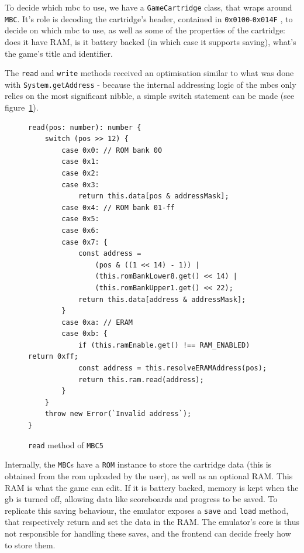 \documentclass[11pt]{report}
\begin{document}
To decide which \gls{mbc} to use, we have a \texttt{GameCartridge} class, that wraps around \texttt{MBC}. It's role is decoding the cartridge's header, contained in \texttt{0x0100}-\texttt{0x014F} \cite[The Cartridge Header]{pandoc}, to decide on which \gls{mbc} to use, as well as some of the properties of the cartridge: does it have RAM, is it battery backed (in which case it supports saving), what's the game's title and identifier.

The \texttt{read} and \texttt{write} methods received an optimisation similar to what was done with \texttt{System.getAddress} - because the internal addressing logic of the \glspl{mbc} only relies on the most significant nibble, a simple switch statement can be made (see figure~\ref{fig:mbc-read-switch}).

\begin{figure}[h]
    \begin{verbatim}
read(pos: number): number {
    switch (pos >> 12) {
        case 0x0: // ROM bank 00
        case 0x1:
        case 0x2:
        case 0x3:
        	return this.data[pos & addressMask];
        case 0x4: // ROM bank 01-ff
        case 0x5:
        case 0x6:
        case 0x7: {
            const address =
                (pos & ((1 << 14) - 1)) |
                (this.romBankLower8.get() << 14) |
                (this.romBankUpper1.get() << 22);
            return this.data[address & addressMask];
        }
        case 0xa: // ERAM
        case 0xb: {
            if (this.ramEnable.get() !== RAM_ENABLED) return 0xff;
            const address = this.resolveERAMAddress(pos);
            return this.ram.read(address);
        }
    }
    throw new Error(`Invalid address`);
}
    \end{verbatim}
    \caption{\texttt{read} method of \texttt{MBC5} \cite[MBC5]{pandoc}}
    \label{fig:mbc-read-switch}
\end{figure}

Internally, the \texttt{MBC}s have a \texttt{ROM} instance to store the cartridge data (this is obtained from the \gls{rom} uploaded by the user), as well as an optional RAM. This RAM is what the game can edit. If it is battery backed, memory is kept when the \gls{gb} is turned off, allowing data like scoreboards and progress to be saved. To replicate this saving behaviour, the emulator exposes a \texttt{save} and \texttt{load} method, that respectively return and set the data in the RAM. The emulator's core is thus not responsible for handling these saves, and the frontend can decide freely how to store them.
\end{document}
